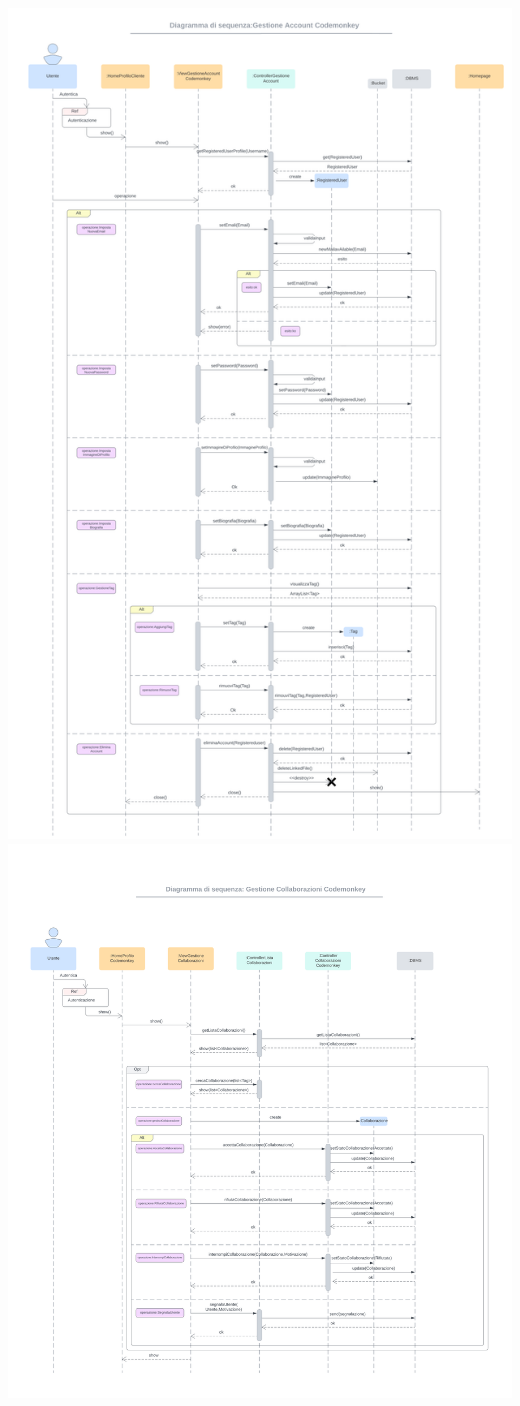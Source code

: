 \includegraphics[width=1\textwidth]{assets/img/sequenza_dettaglio/codemonkey-1.png}\\
\includegraphics[width=1\textwidth]{assets/img/sequenza_dettaglio/codemonkey-2.png}\\